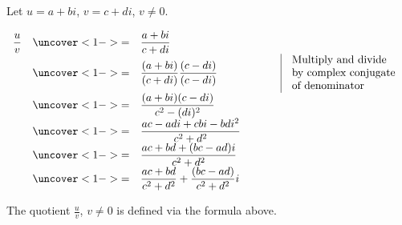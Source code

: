 \begin{frame}
Let $u=a+bi$, $v=c+di$, $v\neq 0$.
\begin{example}
$\begin{array}{rcll|l}
\displaystyle\frac{u}{v}&\uncover<1->{=}& \displaystyle\frac{a+bi}{c+di}~~~~~~~~~~~~~~~~~~~~~~~~~~\\
&\uncover<1->{=}&\displaystyle \frac{(a+bi)}{(c+di)}\frac{(c-di)}{(c-di)} & & \begin{array}{l}
\text{Multiply and divide } \\
\text{by complex conjugate }\\
\text{of denominator}
\end{array}
\\
&\uncover<1->{=}&\displaystyle \frac{(a+bi)(c-di)}{c^2-(di)^2}\\
&\uncover<1->{=}&\displaystyle \frac{ac-adi+cbi-bdi^2}{c^2+d^2}\\
&\uncover<1->{=}&\displaystyle \frac{ac+bd+(bc-ad)i}{c^2+d^2}\\
&\uncover<1->{=}&\displaystyle \frac{ac+bd}{c^2+d^2}+\frac{(bc-ad)}{c^2+d^2}i\\
\end{array}
$
\end{example}
\vskip -0.17cm
\begin{definition}
The quotient $\frac{u}{v}$, $v\neq 0$ is defined via the formula above.
\end{definition}
\vskip 10cm
\end{frame}
